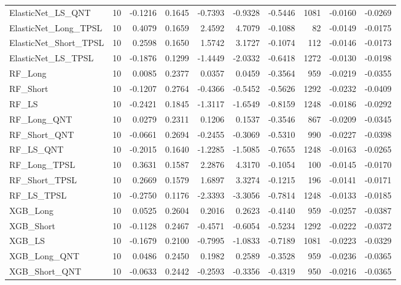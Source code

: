 \begin{tabular}{llrrrrrrrr}
\cline{1-10}
ElasticNet\_LS\_QNT & 10 & -0.1216 & 0.1645 & -0.7393 & -0.9328 & -0.5446 & 1081 & -0.0160 & -0.0269 \\
\cline{1-10}
ElasticNet\_Long\_TPSL & 10 & 0.4079 & 0.1659 & 2.4592 & 4.7079 & -0.1088 & 82 & -0.0149 & -0.0175 \\
\cline{1-10}
ElasticNet\_Short\_TPSL & 10 & 0.2598 & 0.1650 & 1.5742 & 3.1727 & -0.1074 & 112 & -0.0146 & -0.0173 \\
\cline{1-10}
ElasticNet\_LS\_TPSL & 10 & -0.1876 & 0.1299 & -1.4449 & -2.0332 & -0.6418 & 1272 & -0.0130 & -0.0198 \\
\cline{1-10}
RF\_Long & 10 & 0.0085 & 0.2377 & 0.0357 & 0.0459 & -0.3564 & 959 & -0.0219 & -0.0355 \\
\cline{1-10}
RF\_Short & 10 & -0.1207 & 0.2764 & -0.4366 & -0.5452 & -0.5626 & 1292 & -0.0232 & -0.0409 \\
\cline{1-10}
RF\_LS & 10 & -0.2421 & 0.1845 & -1.3117 & -1.6549 & -0.8159 & 1248 & -0.0186 & -0.0292 \\
\cline{1-10}
RF\_Long\_QNT & 10 & 0.0279 & 0.2311 & 0.1206 & 0.1537 & -0.3546 & 867 & -0.0209 & -0.0345 \\
\cline{1-10}
RF\_Short\_QNT & 10 & -0.0661 & 0.2694 & -0.2455 & -0.3069 & -0.5310 & 990 & -0.0227 & -0.0398 \\
\cline{1-10}
RF\_LS\_QNT & 10 & -0.2015 & 0.1640 & -1.2285 & -1.5085 & -0.7655 & 1248 & -0.0163 & -0.0265 \\
\cline{1-10}
RF\_Long\_TPSL & 10 & 0.3631 & 0.1587 & 2.2876 & 4.3170 & -0.1054 & 100 & -0.0145 & -0.0170 \\
\cline{1-10}
RF\_Short\_TPSL & 10 & 0.2669 & 0.1579 & 1.6897 & 3.3274 & -0.1215 & 196 & -0.0141 & -0.0171 \\
\cline{1-10}
RF\_LS\_TPSL & 10 & -0.2750 & 0.1176 & -2.3393 & -3.3056 & -0.7814 & 1248 & -0.0133 & -0.0185 \\
\cline{1-10}
XGB\_Long & 10 & 0.0525 & 0.2604 & 0.2016 & 0.2623 & -0.4140 & 959 & -0.0257 & -0.0387 \\
\cline{1-10}
XGB\_Short & 10 & -0.1128 & 0.2467 & -0.4571 & -0.6054 & -0.5234 & 1292 & -0.0222 & -0.0372 \\
\cline{1-10}
XGB\_LS & 10 & -0.1679 & 0.2100 & -0.7995 & -1.0833 & -0.7189 & 1081 & -0.0223 & -0.0329 \\
\cline{1-10}
XGB\_Long\_QNT & 10 & 0.0486 & 0.2450 & 0.1982 & 0.2589 & -0.3528 & 959 & -0.0236 & -0.0365 \\
\cline{1-10}
XGB\_Short\_QNT & 10 & -0.0633 & 0.2442 & -0.2593 & -0.3356 & -0.4319 & 950 & -0.0216 & -0.0365 \\

\end{tabular}
